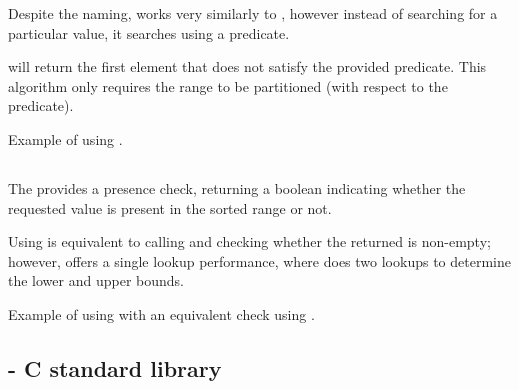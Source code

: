 Despite the naming,  works very similarly to , however instead of searching for a particular value, it searches using a predicate.


 will return the first element that does not satisfy the provided predicate. This algorithm only requires the range to be partitioned (with respect to the predicate).

\begin{box-note}
\footnotesize Example of using .
\tcblower
{}
\end{box-note}

\subsection{\texorpdfstring{}{\texttt{std::binary\_search}}}

The  provides a presence check, returning a boolean indicating whether the requested value is present in the sorted range or not.


Using  is equivalent to calling  and checking whether the returned is non-empty; however,  offers a single lookup performance, where  does two lookups to determine the lower and upper bounds.

\begin{box-note}
\footnotesize Example of using  with an equivalent check using .
\tcblower
{}
\end{box-note}

\subsection{\texorpdfstring{ - C standard library}{\texttt{bsearch} - C standard library}}

